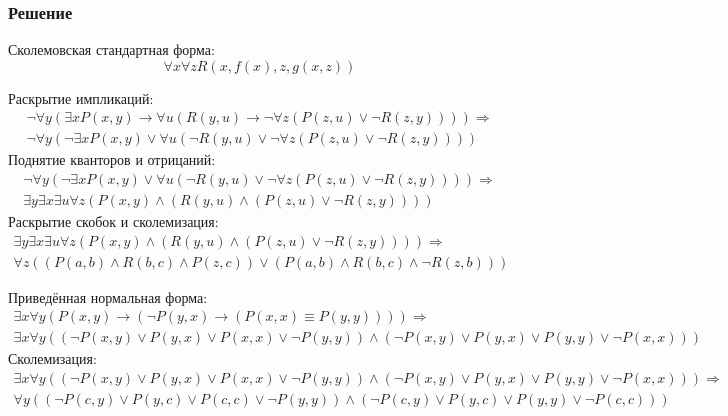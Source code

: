 \documentclass[11pt]{article}
\begin{document}
\subsubsection{Решение}
\label{sec:orgd9d5c95}
Сколемовская стандартная форма:
\begin{equation*}
\forall x \forall z R(x, f(x), z, g(x, z))
\end{equation*}

Раскрытие импликаций:
\begin{multline*}
\lnot \forall y (\exists x P(x, y) \to \forall u (R(y, u) \to \lnot \forall z (P(z, u) \lor \lnot R(z, y))))
\Rightarrow \\
\lnot \forall y (\lnot \exists x P(x, y) \lor \forall u (\lnot R(y, u) \lor \lnot \forall z (P(z, u) \lor \lnot R(z, y))))
\end{multline*}
Поднятие кванторов и отрицаний:
\begin{multline*}
\lnot \forall y (\lnot \exists x P(x, y) \lor \forall u (\lnot R(y, u) \lor \lnot \forall z (P(z, u) \lor \lnot R(z, y))))
\Rightarrow \\
\exists y \exists x \exists u \forall z (P(x, y) \land (R(y, u) \land (P(z, u) \lor \lnot R(z, y))))
\end{multline*}
Раскрытие скобок и сколемизация:
\begin{multline*}
\exists y \exists x \exists u \forall z (P(x, y) \land (R(y, u) \land (P(z, u) \lor \lnot R(z, y))))
\Rightarrow \\
\forall z ((P(a, b) \land R(b, c) \land P(z, c)) \lor (P(a, b) \land R(b, c) \land \lnot R(z, b)))
\end{multline*}

Приведённая нормальная форма:
\begin{multline*}
\exists x \forall y (P(x, y) \to (\lnot P(y, x) \to (P(x, x) \equiv P(y, y))))
\Rightarrow \\
\exists x \forall y ((\lnot P(x, y) \lor P(y, x) \lor P(x, x) \lor \lnot P(y, y)) \land (\lnot P(x, y) \lor P(y, x) \lor P(y, y) \lor \lnot P(x, x)))
\end{multline*}
Сколемизация:
\begin{multline*}
\exists x \forall y ((\lnot P(x, y) \lor P(y, x) \lor P(x, x) \lor \lnot P(y, y)) \land (\lnot P(x, y) \lor P(y, x) \lor P(y, y) \lor \lnot P(x, x)))
\Rightarrow \\
\forall y ((\lnot P(c, y) \lor P(y, c) \lor P(c, c) \lor \lnot P(y, y)) \land (\lnot P(c, y) \lor P(y, c) \lor P(y, y) \lor \lnot P(c, c)))
\end{multline*}
\end{document}

